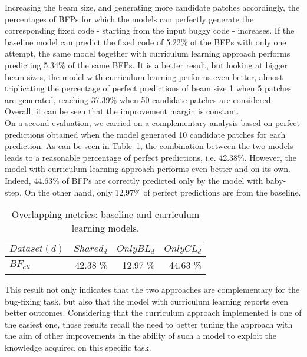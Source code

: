 Increasing the beam size, and generating more candidate patches accordingly,
the percentages of BFPs for which the models can perfectly generate the corresponding
fixed code - starting from the input buggy code - increases. If the baseline model can predict
the fixed code of 5.22\% of the BFPs with only one attempt, the same model together with 
curriculum learning approach performs predicting 5.34\% of the same BFPs. It is a 
better result,
but looking at bigger beam sizes, the model with curriculum learning performs 
even better, almost triplicating the percentage of perfect predictions of beam size 1 when 5 patches are generated,
reaching 37.39\% when 50 candidate patches are considered. Overall, it can be seen that
the improvement margin is constant.\\
On a second evaluation, we carried on a complementary analysis based on perfect predictions
obtained when the model generated 10 candidate patches for each prediction. 
As can be seen 
in Table~\ref{table:pp_bugfixing_overlap}, the combination between the two models 
leads to a reasonable percentage of perfect predictions, i.e. 42.38\%. However, the model 
with curriculum learning approach performs even better and on its own. Indeed, 44.63\% of BFPs are correctly predicted
only by the model with baby-step. On the other hand, only 12.97\% of perfect predictions are from the baseline.
\begin{table}[h!]
    \centering
    \begin{tabular}{l|r|r|r}
    \(Dataset (d)\) & \(Shared_d\) & \(OnlyBL_d\) & \(OnlyCL_d\)\\ [0.5ex]
    \hline 
    \(BF_{all}\) & 42.38 \% & 12.97 \% & 44.63 \%\\  [1ex]
    \end{tabular}
    \caption{Overlapping metrics: baseline and curriculum learning models.}
    \label{table:pp_bugfixing_overlap}
\end{table}
This result not only indicates that the two approaches are complementary for
the bug-fixing task, but also that the model with curriculum learning reports even 
better outcomes. Considering that the curriculum approach implemented is one of the easiest one,
those results recall the need to better tuning the approach with the aim of 
other improvements in the ability of such a model to exploit the knowledge acquired on 
this specific task. 

